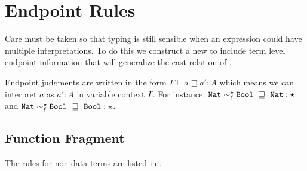 \section{Endpoint Rules}

Care must be taken so that typing is still sensible when an expression could have multiple interpretations.
To do this we construct a new \csys{} to include term level endpoint information that will generalize the cast relation of .

Endpoint judgments are written in the form $\varGamma\vdash a\sqsupseteq a':A$ which means we can interpret $a$ as $a' : A$ in variable context $\varGamma$.
For instance, $\mathtt{Nat}{} \sim_{\ell}^{\star}\mathtt{Bool}{}\ \sqsupseteq\ \mathtt{Nat}{}:\star$ and $\Nat{} \sim_{\ell}^{\star}\Bool{}\ \sqsupseteq\ \Bool{}:\star$.

\subsection{Function Fragment}
The rules for non-data terms are listed in .

